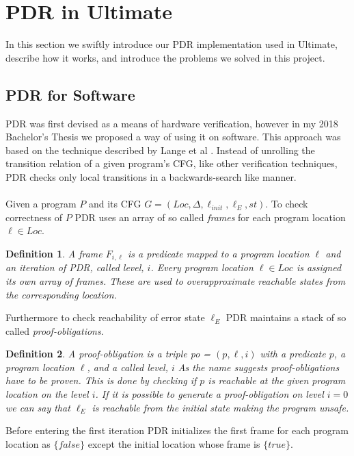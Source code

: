 \documentclass{article}
\newtheorem{mydef}{Definition}
\begin{document}
	\pagebreak
	
	\section{PDR in Ultimate}
	In this section we swiftly introduce our PDR implementation used in Ultimate, describe how it works, and introduce the problems we solved in this project.
	
	\subsection{PDR for Software}
	PDR was first devised as a means of hardware verification, however in my 2018 Bachelor's Thesis we proposed a way of using it on software. This approach was based on the technique described by Lange et al \cite{DBLP:conf/fmcad/0001NN15}.
	Instead of unrolling the transition relation of a given program's CFG, like other verification techniques, PDR checks only local transitions in a backwards-search like manner. \\ \\
	Given a program $P$ and its CFG  $G = (Loc, \Delta, \ell_{init}, \ell_E, st)$. To check correctness of $P$ PDR uses an array of so called \textsl{frames} for each program location $\ell \in Loc$. 
	\begin{mydef}
		A frame $F_{i,\ell}$ is a predicate mapped to a program location $\ell$ and an iteration of PDR, called level, $i$.
		Every program location $\ell \in Loc$ is assigned its own array of frames. These are used to overapproximate reachable states from the corresponding location.
	\end{mydef}
	Furthermore to check reachability of error state $\ell_E$ PDR maintains a stack of so called \textsl{proof-obligations}.
	\begin{mydef}
		A proof-obligation is a triple po = $(p, \ell, i)$ with a predicate $p$, a program location $\ell$, and a called level, $i$
		As the name suggests proof-obligations have to be proven. This is done by checking if $p$ is reachable at the given program location on the level $i$. If it is possible to generate a proof-obligation on level $i = 0$ we can say that $\ell_E$ is reachable from the initial state making the program unsafe.
	\end{mydef}

	Before entering the first iteration PDR initializes the first frame for each program location as $\{ false \}$ except the initial location whose frame is $\{ true \}$. \\ \\
	
\end{document}
